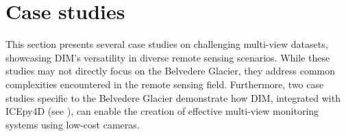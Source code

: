 



\section{Case studies}\label{sec:5:methods}

This section presents several case studies on challenging multi-view datasets, showcasing DIM's versatility in diverse remote sensing scenarios.
While these studies may not directly focus on the Belvedere Glacier, they address common complexities encountered in the remote sensing field.  
Furthermore, two case studies specific to the Belvedere Glacier demonstrate how DIM, integrated with ICEpy4D (see ), can enable the creation of effective multi-view monitoring systems using low-cost cameras.

